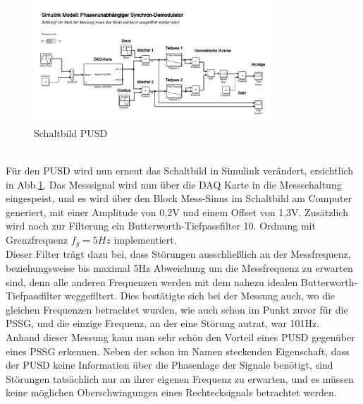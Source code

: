 \begin{figure}[h]
	\centering
	\includegraphics[width=0.8\textwidth]{./img/ch6/6_3_6}
	\caption{Schaltbild PUSD}
	\label{fg:schalt_pusd}
\end{figure}
~\\
Für den PUSD wird nun erneut das Schaltbild in Simulink verändert, ersichtlich in Abb.\ref{fg:schalt_pusd}. Das Messsignal wird nun über die DAQ Karte in die Messschaltung eingespeist, und es wird über den Block Mess-Sinus im Schaltbild am Computer generiert, mit einer Amplitude von 0,2V und einem Offset von 1,3V. Zusätzlich wird noch zur Filterung ein Butterworth-Tiefpassfilter 10. Ordnung mit Grenzfrequenz $f_g = 5Hz$ implementiert.
~\\
Dieser Filter trägt dazu bei, dass Störungen ausschließlich an der Messfrequenz, beziehungsweise bis maximal 5Hz Abweichung um die Messfrequenz zu erwarten sind, denn alle anderen Frequenzen werden mit dem nahezu idealen Butterworth-Tiefpassfilter weggefiltert. Dies bestätigte sich bei der Messung auch, wo die gleichen Frequenzen betrachtet wurden, wie auch schon im Punkt zuvor für die PSSG, und die einzige Frequenz, an der eine Störung autrat, war 101Hz.
~\\
Anhand dieser Messung kann man sehr schön den Vorteil eines PUSD gegenüber eines PSSG erkennen. Neben der schon im Namen steckenden Eigenschaft, dass der PUSD keine Information über die Phasenlage der Signale benötigt, sind Störungen tatsächlich nur an ihrer eigenen Frequenz zu erwarten, und es müssen keine möglichen Oberschwingungen eines Rechtecksignals betrachtet werden.















